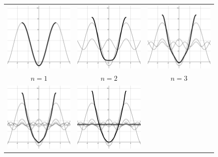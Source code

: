 \documentclass[11pt]{amsart}
\theoremstyle{plain}
\theoremstyle{definition}
\begin{document}
\begin{figure}[ht!]
\centering
\begin{tabular}{ccc}
  \includegraphics[width=40mm]{Images/simple_1.png} &
  \includegraphics[width=40mm]{Images/simple_2.png} &
  \includegraphics[width=40mm]{Images/simple_3.png} \\
  $n=1$ & $n=2$ & $n=3$\\[6pt]
  \includegraphics[width=40mm]{Images/simple_5.png} &
  \includegraphics[width=40mm]{Images/simple_10.png} &

\end{tabular}
\end{figure}
\end{document}
